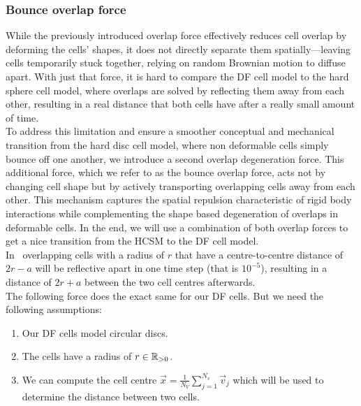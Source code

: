 \subsubsection*{Bounce overlap force} 
While the previously introduced overlap force effectively reduces cell overlap by deforming the cells' shapes, it does not directly separate them spatially—leaving cells temporarily stuck together, relying on random Brownian motion to diffuse apart. 
With just that force, it is hard to compare the DF cell model to the hard sphere cell model, where overlaps are solved by reflecting them away from each other, resulting in a real distance that both cells have after a really small amount of time. \\  
To address this limitation and ensure a smoother conceptual and mechanical transition from the hard disc cell model, where non deformable cells simply bounce off one another, we introduce a second overlap degeneration force. 
This additional force, which we refer to as the bounce overlap force, acts not by changing cell shape but by actively transporting overlapping cells away from each other. 
This mechanism captures the spatial repulsion characteristic of rigid body interactions while complementing the shape based degeneration of overlaps in deformable cells. 
In the end, we will use a combination of both overlap forces to get a nice transition from the HCSM to the DF cell model. \\ 
In~\cite{Bruna2012} overlapping cells with a radius of $r$ that have a centre-to-centre distance of $2r - a$ will be reflective apart in one time step (that is $10^{-5}$), resulting in a distance of $2r + a$ between the two cell centres afterwards. \\
The following force does the exact same for our DF cells. 
But we need the following assumptions:
\begin{enumerate}
	\item Our DF cells model circular discs. 
	\item The cells have a radius of $r \in \mathbb{R}_{>0}$.
	\item We can compute the cell centre $\vec{x} = \frac{1}{N_V}\sum\limits_{j = 1}^{N_v} \vec{v}_j$ which will be used to determine the distance between two cells. 
\end{enumerate}

